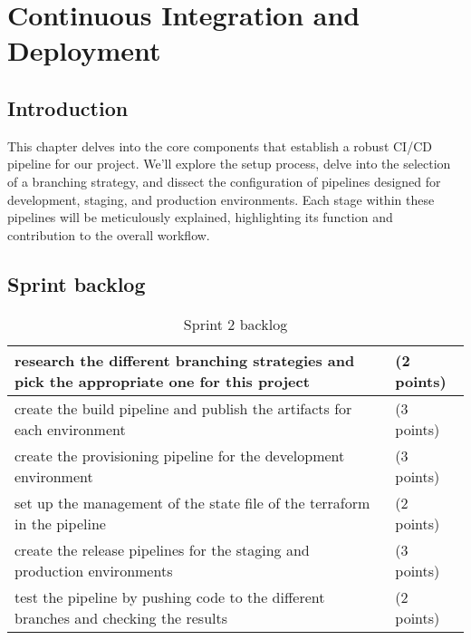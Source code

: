 \chapter{Continuous Integration and Deployment}

\section*{Introduction}
This chapter delves into the core components that establish a robust CI/CD pipeline for our project. We'll explore the setup process, delve into the selection of a branching strategy, and dissect the configuration of pipelines designed for development, staging, and production environments. Each stage within these pipelines will be meticulously explained, highlighting its function and contribution to the overall workflow.
\section{Sprint backlog}
\begin{longtable}[c]{
    |p{}|
    p{}|
    }
    \caption{Sprint 2 backlog}
    \label{tab:Sprint2_backlog}                                                                            \\
    \hline
    research the different branching strategies and pick the appropriate one for this project & (2 points) \\
    \hline
    create the build pipeline and publish the artifacts for each environment                  & (3 points) \\
    \hline
    create the provisioning pipeline for the development environment                          & (3 points) \\
    \hline
    set up the management of the state file of the terraform in the pipeline                  & (2 points) \\
    \hline
    create the release pipelines for the staging and production environments                  & (3 points) \\
    \hline
    test the pipeline by pushing code to the different branches and checking the results      & (2 points) \\
    \hline
\end{longtable}
